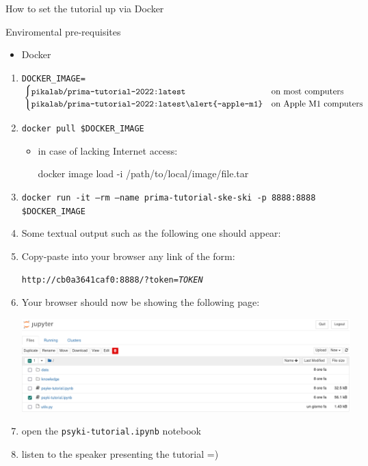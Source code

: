 \documentclass[presentation]{beamer}\mode<presentation>{\usetheme{AMSBolognaFC}}
\begin{document}
\begin{frame}[allowframebreaks]{How to set the tutorial up via Docker}

    \begin{block}{Enviromental pre-requisites}
        \begin{itemize}
            \item Docker
        \end{itemize}
    \end{block}

    \begin{enumerate}
        \item \texttt{DOCKER\_IMAGE=}$\begin{cases}
            \texttt{pikalab/prima-tutorial-2022:latest} & \text{on most computers}
            \\
            \texttt{pikalab/prima-tutorial-2022:latest\alert{-apple-m1}} & \text{on Apple M1 computers}
        \end{cases}$
        \item \texttt{docker pull \$DOCKER\_IMAGE}
        \begin{itemize}
            \item in case of lacking Internet access:
            \begin{center}\ttfamily
                docker image load -i /path/to/local/image/file.tar
            \end{center}
        \end{itemize}
        \item \texttt{docker run -it --rm --name prima-tutorial-ske-ski -p 8888:8888 \$DOCKER\_IMAGE}
        \item Some textual output such as the following one should appear:
        
        \framebreak
        \item Copy-paste into your browser any link of the form: 
        \begin{center}
            \alert{\texttt{http://cb0a3641caf0:8888/?token=\textit{TOKEN}}}
        \end{center}
        \item Your browser should now be showing the following page:
        \begin{center}
            \includegraphics[width=.7\linewidth]{figures/jupyter-docker.png}
        \end{center}
        \item open the \texttt{psyki-tutorial.ipynb} notebook
        \item listen to the speaker presenting the tutorial =)
    \end{enumerate}
\end{frame}
\end{document}
